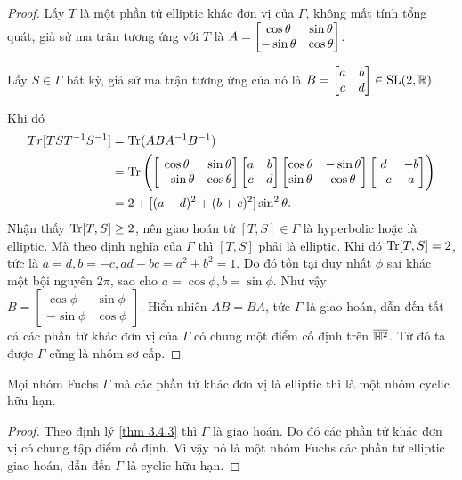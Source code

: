 \begin{proof}
    Lấy $T$ là một phần tử elliptic khác đơn vị của $\Gamma$, không mất tính tổng quát, giả sử ma trận tương ứng với $T$ là $A = \begin{bmatrix} \cos{\theta} & \sin{\theta}\\ -\sin{\theta} & \cos{\theta} \end{bmatrix}$.

    Lấy $S \in \Gamma$ bất kỳ, giả sử ma trận tương ứng của nó là $B = \begin{bmatrix} a & b \\ c & d \\ \end{bmatrix} \in \operatorname{SL}(2,\mathbb{R})$. 

    Khi đó 
    \begin{align*}
        Tr[TST^{-1}S^{-1}]
        &=\operatorname{Tr}(ABA^{-1}B^{-1})\\
        &= \operatorname{Tr}\left(\begin{bmatrix} \cos{\theta} & \sin{\theta}\\ -\sin{\theta} & \cos{\theta} \end{bmatrix} \begin{bmatrix} a & b \\ c & d \\ \end{bmatrix}\begin{bmatrix}
            \cos \theta & -\sin \theta\\
            \sin \theta & \cos\theta
        \end{bmatrix}\begin{bmatrix}
            d & -b\\
            -c & a
         \end{bmatrix}\right)\\
        &= 2 + [(a-d)^2+(b+c)^2]\sin^2\theta.
         \end{align*}
         Nhận thấy $\operatorname{Tr}[T,S] \geq 2$, nên giao hoán tử $[T,S] \in \Gamma$ là hyperbolic hoặc là elliptic. Mà theo định nghĩa của $\Gamma$ thì $[T,S]$ phải là elliptic. Khi đó $\operatorname{Tr}[T,S] = 2$, tức là $a = d, b = -c, ad-bc = a^2+b^2 = 1$. Do đó tồn tại duy nhất $\phi$ sai khác một bội nguyên $2\pi$, sao cho $a = \cos\phi, b = \sin\phi$. Như vậy $B = \begin{bmatrix}
            \cos \phi & \sin \phi\\
            -\sin \phi & \cos\phi
        \end{bmatrix}$. 
        Hiển nhiên $AB = BA$, tức $\Gamma$ là giao hoán, dẫn đến tất cả các phần tử khác đơn vị của $\Gamma$ có chung một điểm cố định trên $\overline{\mathbb{H}^2}$. Từ đó ta được $\Gamma$ cũng là nhóm sơ cấp.
\end{proof}
\begin{cor}
    Mọi nhóm Fuchs $\Gamma$ mà các phần tử khác đơn vị là elliptic thì là một nhóm cyclic hữu hạn.
\end{cor}
\begin{proof}
    Theo định lý \ref{thm 3.4.3} thì $\Gamma$ là giao hoán. Do đó các phần tử khác đơn vị có chung tập điểm cố định. Vì vậy nó là một nhóm Fuchs các phần tử elliptic giao hoán, dẫn đến $\Gamma$ là cyclic hữu hạn.
\end{proof}
